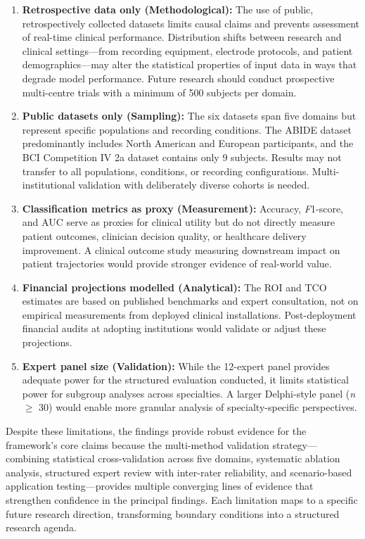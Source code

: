 \begin{enumerate}
    \item \textbf{Retrospective data only (Methodological):} The use of public, retrospectively collected datasets limits causal claims and prevents assessment of real-time clinical performance. Distribution shifts between research and clinical settings---from recording equipment, electrode protocols, and patient demographics---may alter the statistical properties of input data in ways that degrade model performance. Future research should conduct prospective multi-centre trials with a minimum of 500 subjects per domain.

    \item \textbf{Public datasets only (Sampling):} The six datasets span five domains but represent specific populations and recording conditions. The ABIDE dataset predominantly includes North American and European participants, and the BCI Competition IV 2a dataset contains only 9 subjects. Results may not transfer to all populations, conditions, or recording configurations. Multi-institutional validation with deliberately diverse cohorts is needed.

    \item \textbf{Classification metrics as proxy (Measurement):} Accuracy, \textit{F}1-score, and AUC serve as proxies for clinical utility but do not directly measure patient outcomes, clinician decision quality, or healthcare delivery improvement. A clinical outcome study measuring downstream impact on patient trajectories would provide stronger evidence of real-world value.

    \item \textbf{Financial projections modelled (Analytical):} The ROI and TCO estimates are based on published benchmarks and expert consultation, not on empirical measurements from deployed clinical installations. Post-deployment financial audits at adopting institutions would validate or adjust these projections.

    \item \textbf{Expert panel size (Validation):} While the 12-expert panel provides adequate power for the structured evaluation conducted, it limits statistical power for subgroup analyses across specialties. A larger Delphi-style panel (\textit{n} $\geq$ 30) would enable more granular analysis of specialty-specific perspectives.
\end{enumerate}

Despite these limitations, the findings provide robust evidence for the framework's core claims because the multi-method validation strategy---combining statistical cross-validation across five domains, systematic ablation analysis, structured expert review with inter-rater reliability, and scenario-based application testing---provides multiple converging lines of evidence that strengthen confidence in the principal findings. Each limitation maps to a specific future research direction, transforming boundary conditions into a structured research agenda.


